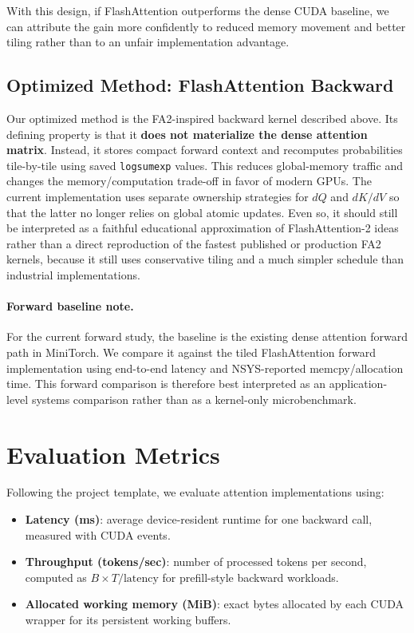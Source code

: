 \documentclass{article}
\begin{document}
With this design, if FlashAttention outperforms the dense CUDA baseline, we can attribute the gain more confidently to reduced memory movement and better tiling rather than to an unfair implementation advantage.

\subsection{Optimized Method: FlashAttention Backward}

Our optimized method is the FA2-inspired backward kernel described above. Its defining property is that it \textbf{does not materialize the dense attention matrix}. Instead, it stores compact forward context and recomputes probabilities tile-by-tile using saved \texttt{logsumexp} values. This reduces global-memory traffic and changes the memory/computation trade-off in favor of modern GPUs. The current implementation uses separate ownership strategies for $dQ$ and $dK/dV$ so that the latter no longer relies on global atomic updates. Even so, it should still be interpreted as a faithful educational approximation of FlashAttention-2 ideas rather than a direct reproduction of the fastest published or production FA2 kernels, because it still uses conservative tiling and a much simpler schedule than industrial implementations.

\paragraph{Forward baseline note.} For the current forward study, the baseline is the existing dense attention forward path in MiniTorch. We compare it against the tiled FlashAttention forward implementation using end-to-end latency and NSYS-reported memcpy/allocation time. This forward comparison is therefore best interpreted as an application-level systems comparison rather than as a kernel-only microbenchmark.

\section{Evaluation Metrics}

Following the project template, we evaluate attention implementations using:
\begin{itemize}
    \item \textbf{Latency (ms)}: average device-resident runtime for one backward call, measured with CUDA events.
    \item \textbf{Throughput (tokens/sec)}: number of processed tokens per second, computed as $B \times T / \text{latency}$ for prefill-style backward workloads.
    \item \textbf{Allocated working memory (MiB)}: exact bytes allocated by each CUDA wrapper for its persistent working buffers.
\end{itemize}
\end{document}
